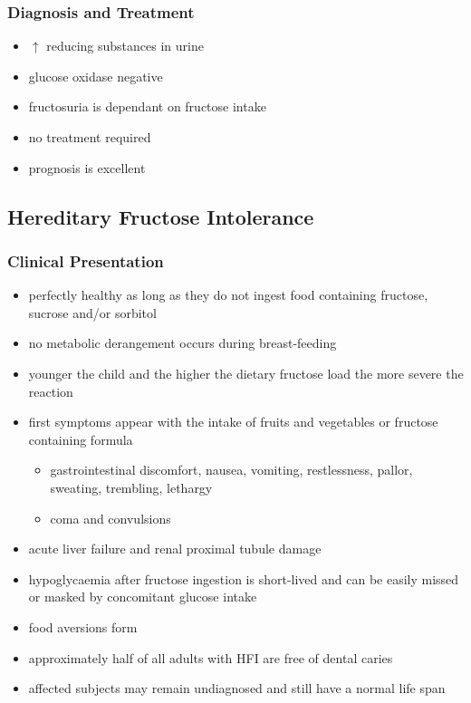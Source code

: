 \documentclass[12pt]{scrartcl}
\begin{document}
\subsubsection{Diagnosis and Treatment}
\label{sec:org51322a1}
\begin{itemize}
\item \(\uparrow\) reducing substances in urine
\item glucose oxidase negative
\item fructosuria is dependant on fructose intake
\item no treatment required
\item prognosis is excellent
\end{itemize}

\subsection{Hereditary Fructose Intolerance}
\label{sec:org08c2294}
\subsubsection{Clinical Presentation}
\label{sec:org25e4427}
\begin{itemize}
\item perfectly healthy as long as they do not ingest food containing
fructose, sucrose and/or sorbitol
\item no metabolic derangement occurs during breast-feeding
\item younger the child and the higher the dietary fructose load the more
severe the reaction
\item first symptoms appear with the intake of fruits and vegetables or
fructose containing formula
\begin{itemize}
\item gastrointestinal discomfort, nausea, vomiting, restlessness,
pallor, sweating, trembling, lethargy
\item coma and convulsions
\end{itemize}
\item acute liver failure and renal proximal tubule damage
\item hypoglycaemia after fructose ingestion is short-lived and can be
easily missed or masked by concomitant glucose intake
\item food aversions form
\item approximately half of all adults with HFI are free of dental caries
\item affected subjects may remain undiagnosed and still have a normal
life span
\end{itemize}
\end{document}
